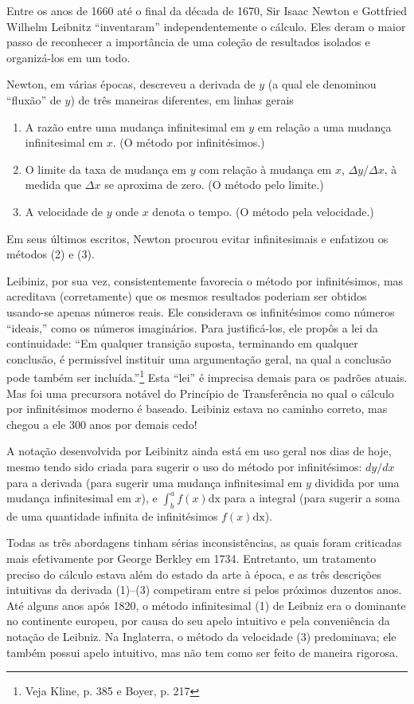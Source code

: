 \documentclass{svmono}
\begin{document}
Entre os anos de 1660 até o final da década de 1670, Sir Isaac Newton e
Gottfried Wilhelm Leibnitz ``inventaram'' independentemente o cálculo.
Eles deram o maior passo de reconhecer a importância de uma coleção
de resultados isolados e organizá-los em um todo.

Newton, em várias épocas, descreveu a derivada de $y$ (a qual ele
denominou ``fluxão'' de $y$) de
três maneiras diferentes, em linhas gerais
\begin{enumerate}[(1)]
\item A razão entre uma mudança infinitesimal em $y$ em relação a
      uma mudança infinitesimal em $x$. (O método por infinitésimos.)
\item O limite da taxa de mudança em $y$ com relação à mudança em $x$,
      $\Delta y / \Delta x$, à medida que $\Delta x$ se aproxima de
      zero. (O método pelo limite.)
\item A velocidade de $y$ onde $x$ denota o tempo. (O método pela
      velocidade.)
\end{enumerate}

Em seus últimos escritos, Newton procurou evitar infinitesimais e
enfatizou os métodos (2) e (3). 

Leibiniz, por sua vez, consistentemente favorecia o método por infinitésimos,
mas acreditava (corretamente) que os mesmos resultados poderiam ser
obtidos usando-se apenas números reais. Ele considerava os infinitésimos
como números ``ideais,'' como os números imaginários. Para justificá-los,
ele propôs a lei da continuidade: ``Em qualquer transição suposta,
terminando em qualquer conclusão, é permissível instituir uma argumentação
geral, na qual a conclusão pode também ser incluída.''\footnote{Veja Kline, p. 385 e Boyer, p. 217} Esta ``lei'' é imprecisa demais para os padrões
atuais. Mas foi uma precursora notável do Princípio de Transferência
no qual o cálculo por infinitésimos moderno é baseado. Leibiniz estava
no caminho correto, mas chegou a ele 300 anos por demais cedo!

A notação desenvolvida por Leibinitz ainda está em uso geral nos dias de hoje,
mesmo tendo sido criada para sugerir o uso do método por infinitésimos:
$dy/dx$ para a derivada (para sugerir uma mudança infinitesimal em $y$
dividida por uma mudança infinitesimal em $x$), e $\int_b^a f(x) \mathrm{dx}$ para a integral (para sugerir a soma de uma quantidade infinita de
infinitésimos $f(x) \mathrm{dx}$).

Todas as três abordagens tinham sérias inconsistências, as quais foram
criticadas mais efetivamente por George Berkley em 1734. Entretanto, um tratamento
preciso do cálculo estava além do estado da arte à época, e as
três descrições intuitivas da derivada (1)--(3) competiram entre si
pelos próximos duzentos anos. Até alguns anos após 1820,
o método infinitesimal (1) de Leibniz era o dominante no continente
europeu, por causa do seu apelo intuitivo e pela conveniência da
notação de Leibniz. Na Inglaterra, o método da velocidade (3)
predominava; ele também possui apelo intuitivo, mas não tem como
ser feito de maneira rigorosa.
\end{document}
